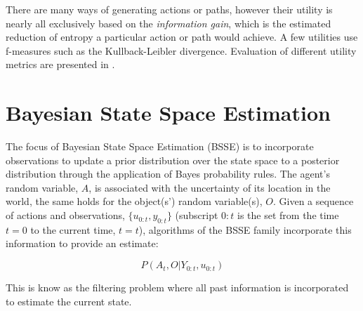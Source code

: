 There are many ways of generating actions or paths, however their utility is nearly all exclusively based on the \textit{information gain}, 
which is the estimated reduction of entropy a particular action or path would achieve. A few utilities use f-measures such as the Kullback-Leibler divergence. 
Evaluation of different utility metrics are presented in \cite{Active_SLAM_Uncertainty_compar,tovar_planning,KL_SLAM_exploration_PF}.



\section{Bayesian State Space Estimation}\label{ch5:BSSE}

The focus of Bayesian State Space Estimation (BSSE) is to incorporate observations to update a prior distribution over
the state space to a posterior distribution through the application of Bayes probability rules. The agent's random variable, $A$, 
is associated with the uncertainty of its location in the world, the same holds for the object(s') random variable(s), $O$. 
Given a sequence of actions and observations, $\{u_{0:t},y_{0:t}\}$ (subscript $0:t$ is the set from the time $t=0$ to the current time, $t=t$), 
algorithms of the BSSE family incorporate this information to provide an estimate:

\begin{equation}
 P(A_t,O|Y_{0:t},u_{0:t}) 
 \label{eq:joint}
\end{equation}

This is know as the filtering problem where all past information is incorporated to estimate the current state.  

